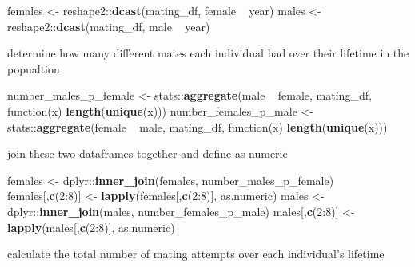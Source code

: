\documentclass[]{article}
\newenvironment{Shaded}{\begin{snugshade}}{\end{snugshade}}
\newcommand{\KeywordTok}[1]{\textcolor[rgb]{0.13,0.29,0.53}{\textbf{{#1}}}}
\newcommand{\DecValTok}[1]{\textcolor[rgb]{0.00,0.00,0.81}{{#1}}}
\newcommand{\StringTok}[1]{\textcolor[rgb]{0.31,0.60,0.02}{{#1}}}
\newcommand{\NormalTok}[1]{{#1}}
\begin{document}
\begin{Shaded}
\begin{Highlighting}[]
\NormalTok{females <-}\StringTok{ }\NormalTok{reshape2::}\KeywordTok{dcast}\NormalTok{(mating_df, female  ~}\StringTok{ }\NormalTok{year)}
\NormalTok{males <-}\StringTok{ }\NormalTok{reshape2::}\KeywordTok{dcast}\NormalTok{(mating_df, male  ~}\StringTok{ }\NormalTok{year)}
\end{Highlighting}
\end{Shaded}

determine how many different mates each individual had over their
lifetime in the popualtion

\begin{Shaded}
\begin{Highlighting}[]
\NormalTok{number_males_p_female <-}\StringTok{ }
\StringTok{  }\NormalTok{stats::}\KeywordTok{aggregate}\NormalTok{(male ~}\StringTok{ }\NormalTok{female, mating_df, function(x) }\KeywordTok{length}\NormalTok{(}\KeywordTok{unique}\NormalTok{(x)))}
\NormalTok{number_females_p_male <-}\StringTok{ }
\StringTok{  }\NormalTok{stats::}\KeywordTok{aggregate}\NormalTok{(female ~}\StringTok{ }\NormalTok{male, mating_df, function(x) }\KeywordTok{length}\NormalTok{(}\KeywordTok{unique}\NormalTok{(x)))}
\end{Highlighting}
\end{Shaded}

join these two dataframes together and define as numeric

\begin{Shaded}
\begin{Highlighting}[]
\NormalTok{females <-}\StringTok{ }\NormalTok{dplyr::}\KeywordTok{inner_join}\NormalTok{(females, number_males_p_female)}
\NormalTok{females[,}\KeywordTok{c}\NormalTok{(}\DecValTok{2}\NormalTok{:}\DecValTok{8}\NormalTok{)] <-}\StringTok{ }
\StringTok{  }\KeywordTok{lapply}\NormalTok{(females[,}\KeywordTok{c}\NormalTok{(}\DecValTok{2}\NormalTok{:}\DecValTok{8}\NormalTok{)], as.numeric)}
\NormalTok{males <-}\StringTok{ }\NormalTok{dplyr::}\KeywordTok{inner_join}\NormalTok{(males, number_females_p_male)}
\NormalTok{males[,}\KeywordTok{c}\NormalTok{(}\DecValTok{2}\NormalTok{:}\DecValTok{8}\NormalTok{)] <-}\StringTok{ }
\StringTok{  }\KeywordTok{lapply}\NormalTok{(males[,}\KeywordTok{c}\NormalTok{(}\DecValTok{2}\NormalTok{:}\DecValTok{8}\NormalTok{)], as.numeric)}
\end{Highlighting}
\end{Shaded}

calculate the total number of mating attempts over each individual's
lifetime
\end{document}
